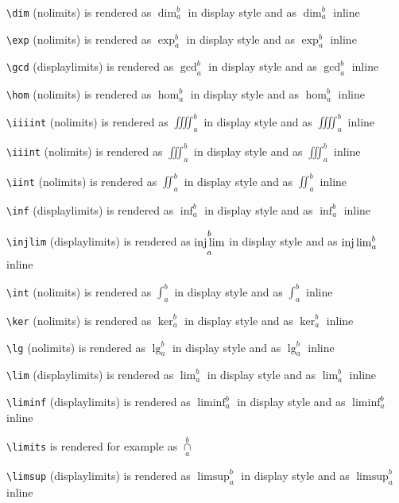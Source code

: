 \texttt{\textbackslash dim} (nolimits) is rendered as $\displaystyle \dim_a^b$ in display style and as $\dim_a^b$ inline

\texttt{\textbackslash exp} (nolimits) is rendered as $\displaystyle \exp_a^b$ in display style and as $\exp_a^b$ inline

\texttt{\textbackslash gcd} (displaylimits) is rendered as $\displaystyle \gcd_a^b$ in display style and as $\gcd_a^b$ inline

\texttt{\textbackslash hom} (nolimits) is rendered as $\displaystyle \hom_a^b$ in display style and as $\hom_a^b$ inline

\texttt{\textbackslash iiiint} (nolimits) is rendered as $\displaystyle \iiiint_a^b$ in display style and as $\iiiint_a^b$ inline

\texttt{\textbackslash iiint} (nolimits) is rendered as $\displaystyle \iiint_a^b$ in display style and as $\iiint_a^b$ inline

\texttt{\textbackslash iint} (nolimits) is rendered as $\displaystyle \iint_a^b$ in display style and as $\iint_a^b$ inline

\texttt{\textbackslash inf} (displaylimits) is rendered as $\displaystyle \inf_a^b$ in display style and as $\inf_a^b$ inline

\texttt{\textbackslash injlim} (displaylimits) is rendered as $\displaystyle \injlim_a^b$ in display style and as $\injlim_a^b$ inline

\texttt{\textbackslash int} (nolimits) is rendered as $\displaystyle \int_a^b$ in display style and as $\int_a^b$ inline

\texttt{\textbackslash ker} (nolimits) is rendered as $\displaystyle \ker_a^b$ in display style and as $\ker_a^b$ inline

\texttt{\textbackslash lg} (nolimits) is rendered as $\displaystyle \lg_a^b$ in display style and as $\lg_a^b$ inline

\texttt{\textbackslash lim} (displaylimits) is rendered as $\displaystyle \lim_a^b$ in display style and as $\lim_a^b$ inline

\texttt{\textbackslash liminf} (displaylimits) is rendered as $\displaystyle \liminf_a^b$ in display style and as $\liminf_a^b$ inline

\texttt{\textbackslash limits} is rendered for example as $\mathop\cap\limits_a^b$

\texttt{\textbackslash limsup} (displaylimits) is rendered as $\displaystyle \limsup_a^b$ in display style and as $\limsup_a^b$ inline

